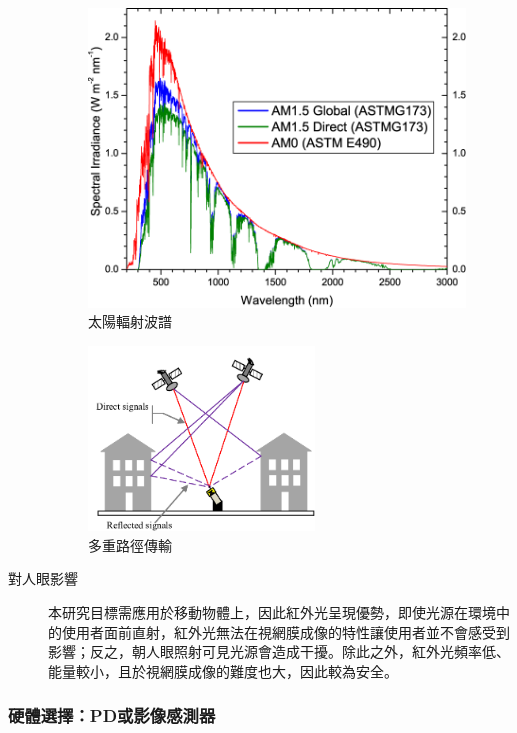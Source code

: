 \begin{description}
        \begin{figure}[ht]
            \centering
            \includegraphics[width=10cm]{ch2pic/solar_spectra.png}
            \caption{太陽輻射波譜\cite{astm}}
            \label{pic:solar_spectrum}
        \end{figure}

        

        \begin{figure}[ht]
            \centering
            \includegraphics[width=6cm]{ch2pic/multipath.png}
            \caption{多重路徑傳輸\cite{pic:multipath}}
            \label{pic:multipath}
        \end{figure}

        \item[對人眼影響]\hfill 

        本研究目標需應用於移動物體上，因此紅外光呈現優勢，即使光源在環境中的使用者面前直射，紅外光無法在視網膜成像的特性讓使用者並不會感受到影響；反之，朝人眼照射可見光源會造成干擾。除此之外，紅外光頻率低、能量較小，且於視網膜成像的難度也大，因此較為安全。

        \end{description}


        

        \subsubsection{硬體選擇：PD或影像感測器}

